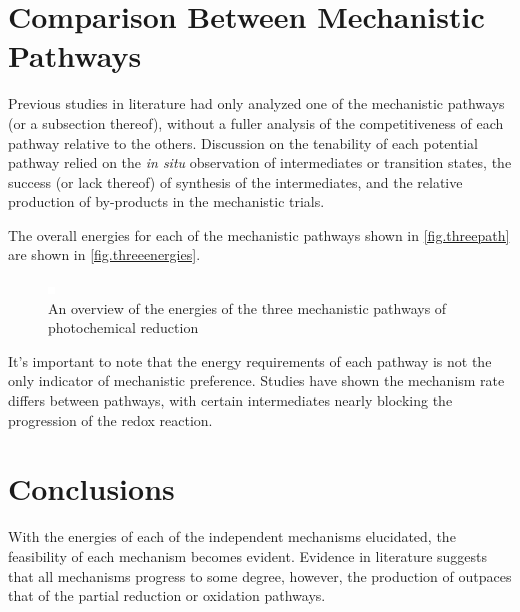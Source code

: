 

\section{Comparison Between Mechanistic Pathways} \label{sec.compare}

Previous studies in literature had only analyzed one of the mechanistic pathways (or a subsection thereof), without a fuller analysis of the competitiveness of each pathway relative to the others. Discussion on the tenability of each potential pathway relied on the \textit{in situ} observation of intermediates or transition states, the success (or lack thereof) of synthesis of the intermediates, and the relative production of by-products in the mechanistic trials. 

The overall energies for each of the mechanistic pathways shown in \autoref{fig.threepath} are shown in \autoref{fig.threeenergies}. 

\begin{figure}[!htbp]
 \begin{center}
  \includegraphics[clip=true]{images/insertgraphic.eps}
 \end{center}
\caption[Reaction energies for three mechanistic pathways]{An overview of the energies of the three mechanistic pathways of photochemical  reduction}
\label{fig.threeenergies}
\end{figure} 

It's important to note that the energy requirements of each pathway is not the only indicator of mechanistic preference. Studies have shown the mechanism rate differs between pathways, with certain intermediates nearly blocking the progression of the redox reaction.



\section{Conclusions} 

With the energies of each of the independent mechanisms elucidated, the feasibility of each mechanism becomes evident. Evidence in literature suggests that all mechanisms progress to some degree, however, the production of  outpaces that of the partial reduction or oxidation pathways. 
